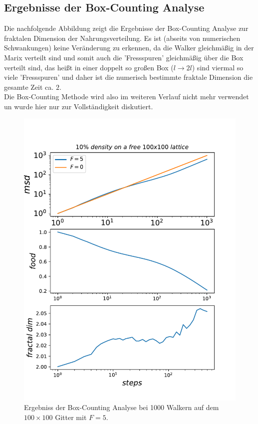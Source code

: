 \documentclass[a4paper, 12pt]{report}
\begin{document}
\newpage

\subsection{Ergebnisse der Box-Counting Analyse}
Die nachfolgende Abbildung zeigt die Ergebnisse der Box-Counting Analyse zur fraktalen Dimension der Nahrungsverteilung. Es ist (abseits von numerischen Schwankungen) keine Veränderung zu erkennen, da die Walker gleichmäßig in der Marix verteilt sind und somit auch die 'Fressspuren' gleichmäßig über die Box verteilt sind, das heißt in einer doppelt so großen Box ($ l \rightarrow 2l$) sind viermal so viele 'Fressspuren' und daher ist die numerisch bestimmte fraktale Dimension die gesamte Zeit ca. $2$.
\\
\noindent Die Box-Counting Methode wird also im weiteren Verlauf nicht mehr verwendet un wurde hier nur zur Vollständigkeit diskutiert. 

\begin{figure}[h!]
	\centering
	\includegraphics[scale=0.75]{10fractal.pdf}
	\caption{Ergebniss der Box-Counting Analyse bei 1000 Walkern auf dem $100\times 100$ Gitter mit $F=5$.}
\end{figure}
\end{document}
